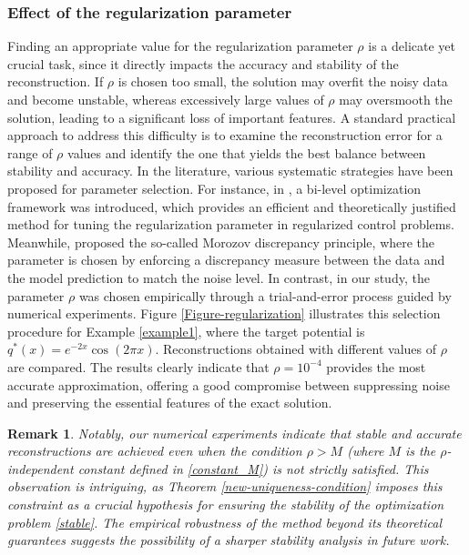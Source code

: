\documentclass[a4paper,12pt,reqno,natbib]{amsart}
\newtheorem{remark}[theorem]{Remark}
\begin{document}
{\subsubsection{\bf Effect of the regularization parameter}\label{sec:reg-term-para}
Finding an appropriate value for the regularization parameter $\rho$ is a delicate yet crucial task, since it directly impacts the accuracy and stability of the reconstruction. If $\rho$ is chosen too small, the solution may overfit the noisy data and become unstable, whereas excessively large values of $\rho$ may oversmooth the solution, leading to a significant loss of important features. A standard practical approach to address this difficulty is to examine the reconstruction error for a range of $\rho$ values and identify the one that yields the best balance between stability and accuracy. In the literature, various systematic strategies have been proposed for parameter selection. For instance, in \cite{oulmelk2022optimal}, a bi-level optimization framework was introduced, which provides an efficient and theoretically justified method for tuning the regularization parameter in regularized control problems. Meanwhile, \cite{engl2015regularization} proposed the so-called Morozov discrepancy principle, where the parameter is chosen by enforcing a discrepancy measure between the data and the model prediction to match the noise level. In contrast, in our study, the parameter $\rho$ was chosen empirically through a trial-and-error process guided by numerical experiments. Figure \ref{Figure-regularization} illustrates this selection procedure for Example \ref{example1}, where the target potential is $q^*(x)=e^{-2x}\cos(2\pi x)$. Reconstructions obtained with different values of $\rho$ are compared. The results clearly indicate that $\rho = 10^{-4}$ provides the most accurate approximation, offering a good compromise between suppressing noise and preserving the essential features of the exact solution.

\begin{remark}
Notably, our numerical experiments indicate that stable and accurate reconstructions are achieved even when the condition $\rho > M$ (where $M$ is the $\rho$-independent constant defined in \eqref{constant_M}) is not strictly satisfied. This observation is intriguing, as Theorem \ref{new-uniqueness-condition} imposes this constraint as a crucial hypothesis for ensuring the stability of the optimization problem \eqref{stable}. The empirical robustness of the method beyond its theoretical guarantees suggests the possibility of a sharper stability analysis in future work.
\end{remark}

}
\end{document}
